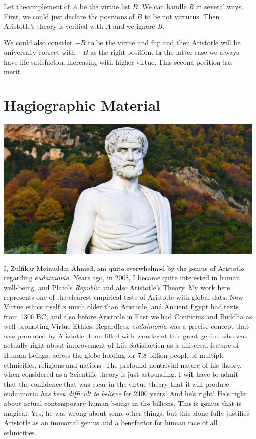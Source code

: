 \documentclass{amsart}
\begin{document}
Let thecomplement of $A$ be the virtue list $B$.  We can handle $B$ in several ways.  First, we could just declare the positions of $B$ to be not virtuous.  Then Aristotle's theory is verified with $A$ and we ignore $B$.  

We could also consider $-B$ to be the virtue and flip and then Aristotle will be universally correct with $-B$ as the right position. In the latter case we always have life satisfaction increasing with higher virtue.  This second position has merit.

\section{Hagiographic Material}

\includegraphics[scale=0.2]{aristotle.jpg}

I, Zulfikar Moinuddin Ahmed, am quite overwhelmed by the genius of Aristotle regarding {\em eudaimonia}.  Years ago, in 2008, I became quite interested in human well-being, and Plato's {\em Republic} and also Aristotle's Theory.  My work here represents one of the clearest empirical tests of Aristotle with global data.  Now Virtue ethics itself is much older than Aristotle, and Ancient Egypt had texts from 1300 BC, and also before Aristotle in East we had Confucius and Buddha as well promoting Virtue Ethics.  Regardless, {\em eudaimonia} was a precise concept that was promoted by Aristotle.  I am filled with wonder at this great genius who was actually right about improvement of Life Satisfaction as a universal feature of Human Beings, across the globe holding for 7.8 billion people of multiple ethnicities, religions and nations.  The profound nontrivial nature of his theory, when considered as a Scientific theory is just astounding.  I will have to admit that the confidence that was clear in the virtue theory that it will produce eudaimonia {\em has been difficult to believe} for 2400 years!  And he's right!  He's right about actual contemporary human beings in the billions.  This is genius that is magical.  Yes, he was wrong about some other things, but this alone fully justifies Aristotle as an immortal genius and a benefactor for human race of all ethnicities.
\end{document}

